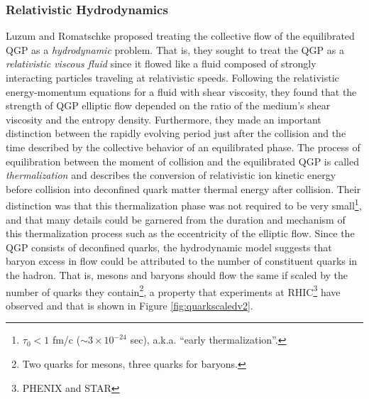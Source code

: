 \subsubsection{Relativistic Hydrodynamics}
Luzum and Romatschke \citep{PhysRevC.78.034915} proposed treating the collective flow of the equilibrated QGP as a \textit{hydrodynamic} problem. That is, they sought to treat the QGP as a \textit{relativistic viscous fluid} since it flowed like a fluid composed of strongly interacting particles traveling at relativistic speeds. Following the relativistic energy-momentum equations for a fluid with shear viscosity, they found that the strength of QGP elliptic flow depended on the ratio of the medium's shear viscosity and the entropy density. Furthermore, they made an important distinction between the rapidly evolving period just after the collision and the time described by the collective behavior of an equilibrated phase. The process of equilibration between the moment of collision and the equilibrated QGP is called \textit{thermalization} and describes the conversion of relativistic ion kinetic energy before collision into deconfined quark matter thermal energy after collision. Their distinction was that this thermalization phase was not required to be very small\footnote{$\tau_0 < 1$ fm/c ($\sim 3 \times 10^{-24}$ sec), a.k.a. ``early thermalization''.}, and that many details could be garnered from the duration and mechanism of this thermalization process such as the eccentricity of the elliptic flow. Since the QGP consists of deconfined quarks, the hydrodynamic model suggests that baryon excess in flow could be attributed to the number of constituent quarks in the hadron. That is, mesons and baryons should flow the same if scaled by the number of quarks they contain\footnote{Two quarks for mesons, three quarks for baryons.}, a property that experiments at RHIC\footnote{PHENIX and STAR} have observed and that is shown in Figure \ref{fig:quarkscaledv2}.

